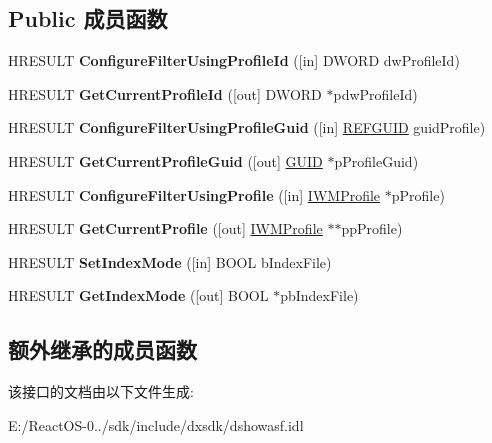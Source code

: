 \subsection*{Public 成员函数}
\begin{DoxyCompactItemize}
\item 
\mbox{\label{interface_i_config_asf_writer_afab811281d4a97bfc7ab9a3fcdf4b9e8}} 
H\+R\+E\+S\+U\+LT {\bfseries Configure\+Filter\+Using\+Profile\+Id} (\mbox{[}in\mbox{]} D\+W\+O\+RD dw\+Profile\+Id)
\item 
\mbox{\label{interface_i_config_asf_writer_a3942370619539a9096b52dd1e089001e}} 
H\+R\+E\+S\+U\+LT {\bfseries Get\+Current\+Profile\+Id} (\mbox{[}out\mbox{]} D\+W\+O\+RD $\ast$pdw\+Profile\+Id)
\item 
\mbox{\label{interface_i_config_asf_writer_a8b6e059c6fc7074981e73669faa3311c}} 
H\+R\+E\+S\+U\+LT {\bfseries Configure\+Filter\+Using\+Profile\+Guid} (\mbox{[}in\mbox{]} \hyperlink{struct___g_u_i_d}{R\+E\+F\+G\+U\+ID} guid\+Profile)
\item 
\mbox{\label{interface_i_config_asf_writer_a584cc82b6cff7c541ba3e908c68c619d}} 
H\+R\+E\+S\+U\+LT {\bfseries Get\+Current\+Profile\+Guid} (\mbox{[}out\mbox{]} \hyperlink{interface_g_u_i_d}{G\+U\+ID} $\ast$p\+Profile\+Guid)
\item 
\mbox{\label{interface_i_config_asf_writer_a594f8e391b226eb100070de7a00de314}} 
H\+R\+E\+S\+U\+LT {\bfseries Configure\+Filter\+Using\+Profile} (\mbox{[}in\mbox{]} \hyperlink{interface_i_w_m_profile}{I\+W\+M\+Profile} $\ast$p\+Profile)
\item 
\mbox{\label{interface_i_config_asf_writer_a69a895e9d0c7579e84063632978ffe3f}} 
H\+R\+E\+S\+U\+LT {\bfseries Get\+Current\+Profile} (\mbox{[}out\mbox{]} \hyperlink{interface_i_w_m_profile}{I\+W\+M\+Profile} $\ast$$\ast$pp\+Profile)
\item 
\mbox{\label{interface_i_config_asf_writer_afa41d3d76b38e994cf7f8b8969bbc652}} 
H\+R\+E\+S\+U\+LT {\bfseries Set\+Index\+Mode} (\mbox{[}in\mbox{]} B\+O\+OL b\+Index\+File)
\item 
\mbox{\label{interface_i_config_asf_writer_ad11c61e51ef29f12ed1698c0ee7b8d94}} 
H\+R\+E\+S\+U\+LT {\bfseries Get\+Index\+Mode} (\mbox{[}out\mbox{]} B\+O\+OL $\ast$pb\+Index\+File)
\end{DoxyCompactItemize}
\subsection*{额外继承的成员函数}


该接口的文档由以下文件生成\+:\begin{DoxyCompactItemize}
\item 
E\+:/\+React\+O\+S-\/0../sdk/include/dxsdk/dshowasf.\+idl\end{DoxyCompactItemize}
